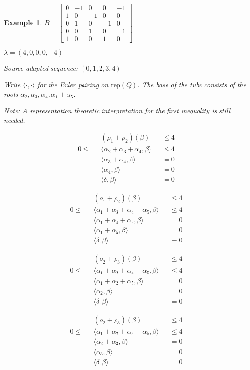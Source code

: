 \documentclass{amsart}
\newtheorem{example}[theorem]{Example}
\numberwithin{theorem}{section}
\newcommand{\rep}{\mathrm{rep}}
\begin{document}
\begin{example}
  $B = \left[\begin{array}{ccccc} 0 & -1 & 0 & 0 & -1\\ 1 & 0 & -1 & 0 & 0\\ 0 & 1 & 0 & -1 & 0\\ 0 & 0 & 1 & 0 & -1\\ 1 & 0 & 0 & 1 & 0\end{array}\right]$

  $\lambda = (4,0,0,0,-4)$

  Source adapted sequence: $(0,1,2,3,4)$

  Write $\langle\cdot,\cdot\rangle$ for the Euler pairing on $\rep(Q)$.
  The base of the tube consists of the roots $\alpha_2,\alpha_3,\alpha_4,\alpha_1+\alpha_5$.

  Note: A representation theoretic interpretation for the first inequality is still needed.

  \begin{align*}
    && (\rho_1+\rho_2)(\beta) &&\leq 4\\
    0 \leq && \langle \alpha_2+\alpha_3+\alpha_4, \beta \rangle &&\leq 4\\
    && \langle \alpha_3+\alpha_4, \beta \rangle &&= 0\\
    && \langle \alpha_4, \beta \rangle &&= 0\\
    && \langle \delta,\beta \rangle &&= 0
  \end{align*}

  \begin{align*}
    && (\rho_1+\rho_2)(\beta) &&\leq 4\\
    0 \leq && \langle \alpha_1+\alpha_3+\alpha_4+\alpha_5, \beta \rangle &&\leq 4\\
    && \langle \alpha_1+\alpha_4+\alpha_5, \beta \rangle &&= 0\\
    && \langle \alpha_1+\alpha_5, \beta \rangle &&= 0\\
    && \langle \delta,\beta \rangle &&= 0
  \end{align*}

  \begin{align*}
    && (\rho_2+\rho_3)(\beta) &&\leq 4\\
    0 \leq && \langle \alpha_1+\alpha_2+\alpha_4+\alpha_5, \beta \rangle &&\leq 4\\
    && \langle \alpha_1+\alpha_2+\alpha_5, \beta \rangle &&= 0\\
    && \langle \alpha_2, \beta \rangle &&= 0\\
    && \langle \delta,\beta \rangle &&= 0
  \end{align*}

  \begin{align*}
    && (\rho_2+\rho_3)(\beta) &&\leq 4\\
    0 \leq && \langle \alpha_1+\alpha_2+\alpha_3+\alpha_5, \beta \rangle &&\leq 4\\
    && \langle \alpha_2+\alpha_3, \beta \rangle &&= 0\\
    && \langle \alpha_3, \beta \rangle &&= 0\\
    && \langle \delta,\beta \rangle &&= 0
  \end{align*}
\end{example}
\end{document}
